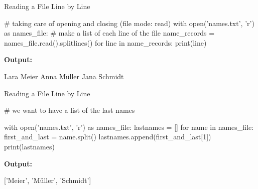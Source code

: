 \documentclass[
  american,
  ignorenonframetext,
]{beamer}
\newenvironment{pyexec}[1]{\noindent \textbf{Output: }  #1}{}
\begin{document}
\begin{frame}{Reading a File Line by Line}
\protect\hypertarget{reading-a-file-line-by-line}{}

\begin{pythoncode}

# taking care of opening and closing (file mode: read)
with open('names.txt', 'r') as names_file:
    # make a list of each line of the file
    name_records = names_file.read().splitlines()
    for line in name_records:
        print(line)

\end{pythoncode}

\begin{pyexec}

\begin{outputcode}

Lara Meier
Anna Müller
Jana Schmidt

\end{outputcode}

\end{pyexec}


\end{frame}

\begin{frame}{Reading a File Line by Line}
\protect\hypertarget{reading-a-file-line-by-line-1}{}

\begin{pythoncode}

# we want to have a list of the last names

with open('names.txt', 'r') as names_file:
    lastnames = []
    for name in names_file:
        first_and_last = name.split()
        lastnames.append(first_and_last[1])
    print(lastnames)

\end{pythoncode}

\begin{pyexec}

\begin{outputcode}

['Meier', 'Müller', 'Schmidt']

\end{outputcode}

\end{pyexec}


\end{frame}
\end{document}
